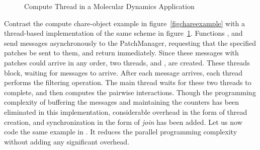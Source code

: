 \begin{figure}
\begin{center}
\end{center}
\caption{Compute Thread in a Molecular Dynamics Application}
\label{figthreadexample}
\end{figure}


Contrast the compute chare-object example in
figure~\ref{figchareexample} with a thread-based implementation of the
same scheme in figure~\ref{figthreadexample}. Functions , 
and  send messages asynchronously to the
PatchManager, requesting that the specified patches be sent to them,
and return immediately. Since these messages with patches could arrive
in any order, two threads,  and , are
created. These threads block, waiting for messages to arrive. After
each message arrives, each thread performs the filtering
operation. The main thread waits for these two threads to complete,
and then computes the pairwise interactions. Though the programming
complexity of buffering the messages and maintaining the counters has
been eliminated in this implementation, considerable overhead in the
form of thread creation, and synchronization in the form of {\em join}
has been added. Let us now code the same example in \sdag. It reduces the
parallel programming complexity without adding any significant
overhead.

